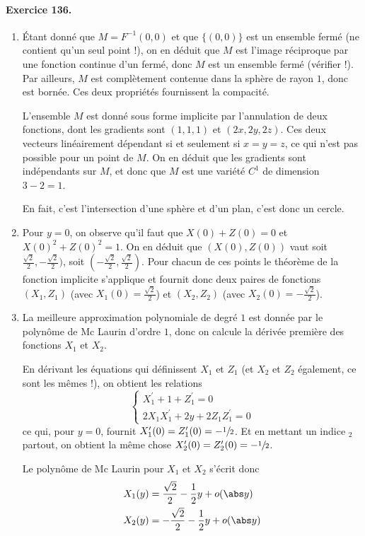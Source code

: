 \paragraph{Exercice 136.}
\begin{enumerate}
\item Étant donné que $ M = F^{-1}(0,0)$ et que $\{(0,0)\}$ est un
ensemble fermé (ne contient qu'un seul point !), on en déduit que
$ M$ est l'image réciproque par une fonction continue d'un
fermé, donc $ M$ est un ensemble fermé (vérifier !).  Par
ailleurs, $ M$ est complètement contenue dans la sphère de rayon
$1$, donc est bornée. Ces deux propriétés fournissent la compacité.

L'ensemble $ M$ est donné sous forme implicite par l'annulation
de deux fonctions, dont les gradients sont $(1,1,1)$ et $(2x,
2y,2z)$. Ces deux vecteurs linéairement dépendant si et seulement si
$x = y = z$, ce qui n'est pas possible pour un point de $ M$. On
en déduit que les gradients sont indépendants sur $ M$, et donc
que $ M$ est une variété $C^1$ de dimension $3 - 2 = 1$.

En fait, c'est l'intersection d'une sphère et d'un plan, c'est donc
un cercle.

\item Pour $y = 0$, on observe qu'il faut que $X(0) + Z(0) = 0$ et
$X(0)^2 + Z(0)^2 = 1$. On en déduit que $(X(0),Z(0))$ vaut soit
$\frac{\sqrt2}{2},-\frac{\sqrt2}{2})$, soit
$(-\frac{\sqrt2}{2},\frac{\sqrt2}{2})$. Pour chacun de ces points le
théorème de la fonction implicite s'applique et fournit donc deux
paires de fonctions $(X_1,Z_1)$ (avec $X_1(0) = \frac{\sqrt2}{2}$) et
$(X_2,Z_2)$ (avec $X_2(0) = -\frac{\sqrt2}{2}$).

\item La meilleure approximation polynomiale de degré $1$ est donnée
par le polynôme de Mc Laurin d'ordre $1$, donc on calcule la dérivée
première des fonctions $X_1$ et $X_2$.

En dérivant les équations qui définissent $X_1$ et $Z_1$ (et $X_2$
et $Z_2$ également, ce sont les mêmes !), on obtient les relations
\begin{equation*}
\begin{cases}
X_1^\prime + 1 + Z_1^\prime = 0\\
2 X_1 X_1^\prime + 2 y + 2 Z_1 Z_1^\prime = 0
\end{cases}
\end{equation*}
ce qui, pour $y = 0$, fournit $X_1^\prime(0) = Z_1^\prime(0) =
-\sfrac12$. Et en mettant un indice ${}_2$ partout, on obtient la
même chose $X_2^\prime(0) = Z_2^\prime(0) = -\sfrac12$.

Le polynôme de Mc Laurin pour $X_1$ et $X_2$ s'écrit donc
\begin{equation*}
\begin{split}
X_1(y) &= \frac{\sqrt2}{2} - \frac12 y + o(\abs y)\\
X_2(y) &= -\frac{\sqrt2}{2} - \frac12 y + o(\abs y)\\
\end{split}
\end{equation*}
\end{enumerate}

